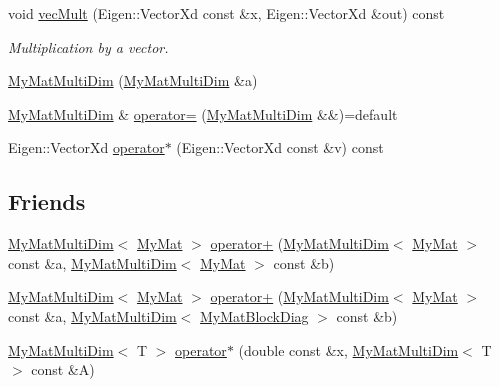 \begin{DoxyCompactItemize}
void \hyperlink{classTspeed_1_1MyMatMultiDim_afb9d095622f3854247206c256d12127c}{vec\-Mult} (Eigen\-::\-Vector\-Xd const \&x, Eigen\-::\-Vector\-Xd \&out) const 
\begin{DoxyCompactList}\small\item\em Multiplication by a vector. \end{DoxyCompactList}\item 
\hyperlink{classTspeed_1_1MyMatMultiDim_a34932323d5f4aff040b1e85f5a89d341}{My\-Mat\-Multi\-Dim} (\hyperlink{classTspeed_1_1MyMatMultiDim}{My\-Mat\-Multi\-Dim} \&a)
\item 
\hyperlink{classTspeed_1_1MyMatMultiDim}{My\-Mat\-Multi\-Dim} \& \hyperlink{classTspeed_1_1MyMatMultiDim_aadd37f5678750bbda4b536ecc5a00851}{operator=} (\hyperlink{classTspeed_1_1MyMatMultiDim}{My\-Mat\-Multi\-Dim} \&\&)=default
\item 
Eigen\-::\-Vector\-Xd \hyperlink{classTspeed_1_1MyMatMultiDim_acc8cd12d144a32a4be0c2dcb015156df}{operator$\ast$} (Eigen\-::\-Vector\-Xd const \&v) const 
\end{DoxyCompactItemize}
\subsection*{Friends}
\begin{DoxyCompactItemize}
\item 
\hyperlink{classTspeed_1_1MyMatMultiDim}{My\-Mat\-Multi\-Dim}$<$ \hyperlink{classTspeed_1_1MyMat}{My\-Mat} $>$ \hyperlink{classTspeed_1_1MyMatMultiDim_a0f13d96f443b5d3fe2e0ce2f128f5c28}{operator+} (\hyperlink{classTspeed_1_1MyMatMultiDim}{My\-Mat\-Multi\-Dim}$<$ \hyperlink{classTspeed_1_1MyMat}{My\-Mat} $>$ const \&a, \hyperlink{classTspeed_1_1MyMatMultiDim}{My\-Mat\-Multi\-Dim}$<$ \hyperlink{classTspeed_1_1MyMat}{My\-Mat} $>$ const \&b)
\item 
\hyperlink{classTspeed_1_1MyMatMultiDim}{My\-Mat\-Multi\-Dim}$<$ \hyperlink{classTspeed_1_1MyMat}{My\-Mat} $>$ \hyperlink{classTspeed_1_1MyMatMultiDim_afe46b501e059ef54cd6701bfae967263}{operator+} (\hyperlink{classTspeed_1_1MyMatMultiDim}{My\-Mat\-Multi\-Dim}$<$ \hyperlink{classTspeed_1_1MyMat}{My\-Mat} $>$ const \&a, \hyperlink{classTspeed_1_1MyMatMultiDim}{My\-Mat\-Multi\-Dim}$<$ \hyperlink{classTspeed_1_1MyMatBlockDiag}{My\-Mat\-Block\-Diag} $>$ const \&b)
\item 
\hyperlink{classTspeed_1_1MyMatMultiDim}{My\-Mat\-Multi\-Dim}$<$ T $>$ \hyperlink{classTspeed_1_1MyMatMultiDim_a10bafacdfbbd9746fab2e746196f4229}{operator$\ast$} (double const \&x, \hyperlink{classTspeed_1_1MyMatMultiDim}{My\-Mat\-Multi\-Dim}$<$ T $>$ const \&A)
\end{DoxyCompactItemize}


